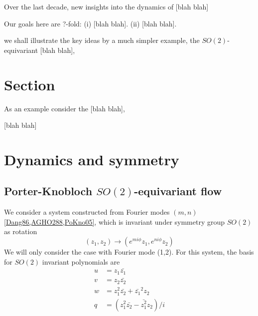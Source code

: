 \documentclass{article}
\begin{document}
Over the last decade, new insights into the dynamics of  [blah blah]

Our goals here are ?-fold:
(i)  [blah blah].
(ii) [blah blah].

we shall illustrate the key ideas by a much
simpler example, the $SO(2)$-equivariant  [blah blah],

\section{Section}
\label{s:cut}


As an example consider the  [blah blah],


 [blah blah]

\section{Dynamics and symmetry}
\label{s:symm}

\subsection{Porter-Knobloch $SO(2)$-equivariant flow}
\label{s:twoMode}

We consider a system constructed from Fourier modes $(m,n)$\ref{Dang86,AGHO288,PoKno05}, which is invariant under symmetry group $SO(2)$ as rotation
\begin{equation}
(z_1,z_2)\to(e^{mi\phi}z_1,e^{ni\phi}z_2)\label{Dang86(1.1)aa}
\end{equation}
We will only consider the case with Fourier mode (1,2). For this system, the basis for $SO(2)$ invariant polynomials are
\begin{align}
u&=z_1\bar{z_1}\\
v&=z_2\bar{z_2}\\
w&=z_1^2\bar{z_2}+\bar{z_1}^2z_2\\
q&=(z_1^2\bar{z_2}-\bar{z_1^2}z_2)/i\\
\label{Dang86(1.2)PK}
\end{align}
\end{document}
